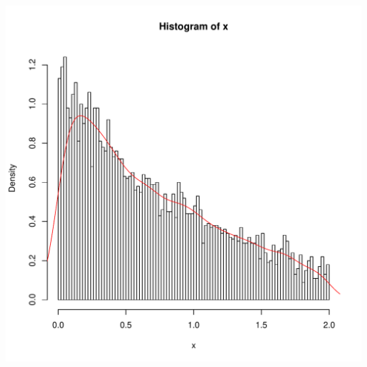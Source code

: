 \documentclass{article}\usepackage[]{graphicx}\usepackage[]{color}
\makeatletter
\def\maxwidth{ %
  \ifdim\Gin@nat@width>\linewidth
    \linewidth
  \else
    \Gin@nat@width
  \fi
}
\newenvironment{knitrout}{}{} %
\makeatother
\begin{document}
\begin{itemize}
\begin{knitrout}
{\centering \includegraphics[width=\maxwidth]{figure/unnamed-chunk-1-1} 

}



\end{knitrout}
\end{itemize}
\end{document}
